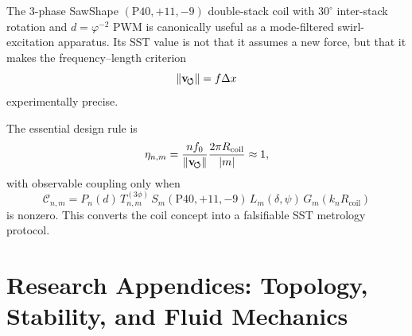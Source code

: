 The 3-phase SawShape $(\mathrm{P40},+11,-9)$ double-stack coil with $30^\circ$ inter-stack rotation and $d=\varphi^{-2}$ PWM is canonically useful as a mode-filtered swirl-excitation apparatus. Its SST value is not that it assumes a new force, but that it makes the frequency--length criterion
\[
\lVert\mathbf{v}_{\!\boldsymbol{\circlearrowleft}}\rVert=f\Delta x
\]
experimentally precise.

The essential design rule is
\[
\eta_{n,m}
=
\frac{n f_0}{\lVert\mathbf{v}_{\!\boldsymbol{\circlearrowleft}}\rVert}
\frac{2\pi R_{\mathrm{coil}}}{|m|}
\approx 1,
\]
with observable coupling only when
\[
\mathcal{C}_{n,m}
=
P_n(d)\,
T_{n,m}^{(3\phi)}\,
S_m(\mathrm{P40},+11,-9)\,
L_m(\delta,\psi)\,
G_m(k_nR_{\mathrm{coil}})
\]
is nonzero. This converts the coil concept into a falsifiable SST metrology protocol.

%
%
%
%
%



\section{Research Appendices: Topology, Stability, and Fluid Mechanics}

